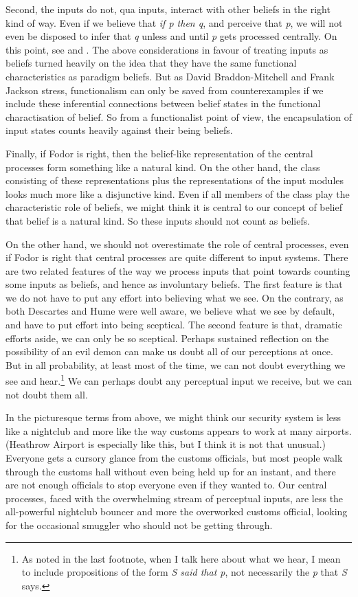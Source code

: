 Second, the inputs do not, qua inputs, interact with other beliefs in the right kind of way. Even if we believe that \textit{if p then q}, and perceive that \textit{p}, we will not even be disposed to infer that \textit{q} unless and until \textit{p} gets processed centrally. On this point, see \citet{Stich1978} and \cite[83-86]{Fodor1983}. The above considerations in favour of treating inputs as beliefs turned heavily on the idea that they have the same functional characteristics as paradigm beliefs. But as David Braddon-Mitchell and Frank Jackson \citeyearpar[114-123]{DBMJackson2007} stress, functionalism can only be saved from counterexamples if we include these inferential connections between belief states in the functional charactisation of belief. So from a functionalist point of view, the encapsulation of input states counts heavily against their being beliefs.

Finally, if Fodor is right, then the belief-like representation of the central processes form something like a natural kind. On the other hand, the class consisting of these representations plus the representations of the input modules looks much more like a disjunctive kind. Even if all members of the class play the characteristic role of beliefs, we might think it is central to our concept of belief that belief is a natural kind. So these inputs should not count as beliefs. 

On the other hand, we should not overestimate the role of central processes, even if Fodor is right that central processes are quite different to input systems. There are two related features of the way we process inputs that point towards counting some inputs as beliefs, and hence as involuntary beliefs. The first feature is that we do not have to put any effort into believing what we see. On the contrary, as both Descartes and Hume were well aware, we believe what we see by default, and have to put effort into being sceptical. The second feature is that, dramatic efforts aside, we can only be so sceptical. Perhaps sustained reflection on the possibility of an evil demon can make us doubt all of our perceptions at once. But in all probability, at least most of the time, we can not doubt everything we see and hear.\footnote{As noted in the last footnote, when I talk here about what we hear, I mean to include propositions of the form \textit{S said that p}, not necessarily the \textit{p} that \textit{S} says.} We can perhaps doubt any perceptual input we receive, but we can not doubt them all.

In the picturesque terms from above, we might think our security system is less like a nightclub and more like the way customs appears to work at many airports. (Heathrow Airport is especially like this, but I think it is not that unusual.) Everyone gets a cursory glance from the customs officials, but most people walk through the customs hall without even being held up for an instant, and there are not enough officials to stop everyone even if they wanted to. Our central processes, faced with the overwhelming stream of perceptual inputs, are less the all-powerful nightclub bouncer and more the overworked customs official, looking for the occasional smuggler who should not be getting through. 

